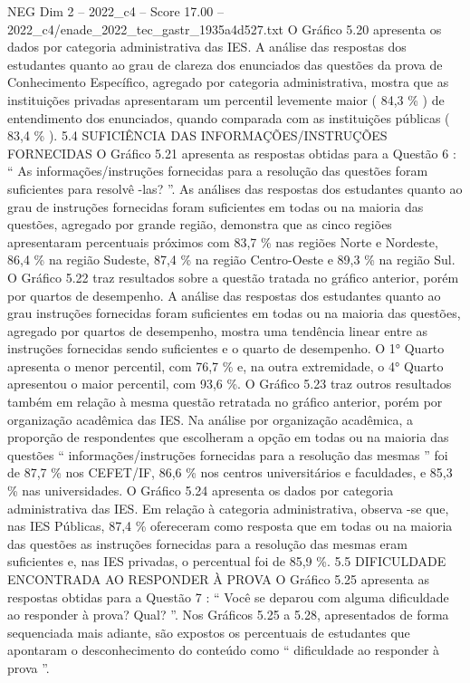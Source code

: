 \begin{textsample}{NEG Dim 2 – 2022\_c4 – Score 17.00 – 2022\_c4/enade\_2022\_tec\_gastr\_1935a4d527.txt}
O Gráfico 5.20 apresenta os dados por categoria administrativa das IES.
A análise das respostas dos estudantes quanto ao grau de clareza dos enunciados das questões da prova de Conhecimento Específico, agregado por categoria administrativa, mostra que as instituições privadas apresentaram um percentil levemente maior ( 84,3 \% ) de entendimento dos enunciados, quando comparada com as instituições públicas ( 83,4 \% ). 5.4 SUFICIÊNCIA DAS INFORMAÇÕES/INSTRUÇÕES FORNECIDAS O Gráfico 5.21 apresenta as respostas obtidas para a Questão 6 : “ As informações/instruções fornecidas para a resolução das questões foram suficientes para resolvê -las? ”.
As análises das respostas dos estudantes quanto ao grau de instruções fornecidas foram suficientes em todas ou na maioria das questões, agregado por grande região, demonstra que as cinco regiões apresentaram percentuais próximos com 83,7 \% nas regiões Norte e Nordeste, 86,4 \% na região Sudeste, 87,4 \% na região Centro-Oeste e 89,3 \% na região Sul.
O Gráfico 5.22 traz resultados sobre a questão tratada no gráfico anterior, porém por quartos de desempenho.
A análise das respostas dos estudantes quanto ao grau instruções fornecidas foram suficientes em todas ou na maioria das questões, agregado por quartos de desempenho, mostra uma tendência linear entre as instruções fornecidas sendo suficientes e o quarto de desempenho.
O 1{\EmojiFont °} Quarto apresenta o menor percentil, com 76,7 \% e, na outra extremidade, o 4{\EmojiFont °} Quarto apresentou o maior percentil, com 93,6 \%.
O Gráfico 5.23 traz outros resultados também em relação à mesma questão retratada no gráfico anterior, porém por organização acadêmica das IES.
Na análise por organização acadêmica, a proporção de respondentes que escolheram a opção em todas ou na maioria das questões “ informações/instruções fornecidas para a resolução das mesmas ” foi de 87,7 \% nos CEFET/IF, 86,6 \% nos centros universitários e faculdades, e 85,3 \% nas universidades.
O Gráfico 5.24 apresenta os dados por categoria administrativa das IES.
Em relação à categoria administrativa, observa -se que, nas IES Públicas, 87,4 \% ofereceram como resposta que em todas ou na maioria das questões as instruções fornecidas para a resolução das mesmas eram suficientes e, nas IES privadas, o percentual foi de 85,9 \%. 5.5 DIFICULDADE ENCONTRADA AO RESPONDER À PROVA O Gráfico 5.25 apresenta as respostas obtidas para a Questão 7 : “ Você se deparou com alguma dificuldade ao responder à prova?
Qual? ”.
Nos Gráficos 5.25 a 5.28, apresentados de forma sequenciada mais adiante, são expostos os percentuais de estudantes que apontaram o desconhecimento do conteúdo como “ dificuldade ao responder à prova ”.

\end{textsample}
